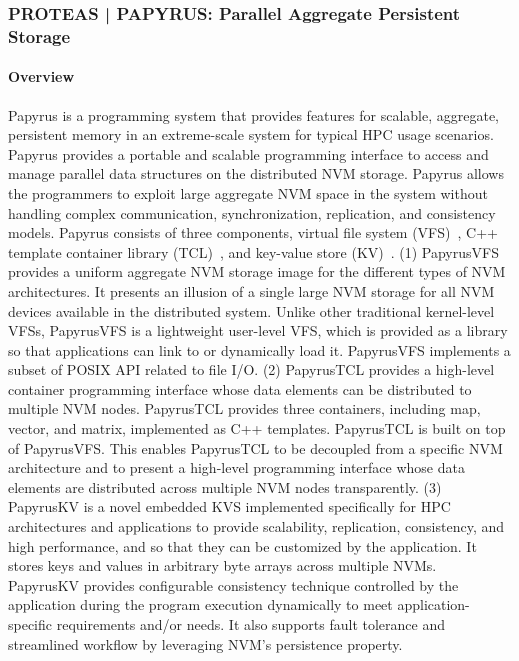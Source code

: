 \subsubsection{PROTEAS | PAPYRUS: Parallel Aggregate Persistent Storage}\label{s:papyrus}

\paragraph{Overview} 
Papyrus is a programming system that provides features for scalable, aggregate, persistent memory in an extreme-scale system for typical HPC usage scenarios. Papyrus provides a portable and scalable programming interface to access and manage parallel data structures on the distributed NVM storage. Papyrus allows the programmers to exploit large aggregate NVM space in the system without handling complex communication, synchronization, replication, and consistency models. Papyrus consists of three components, virtual file system (VFS)~\cite{Kim:2017:DIP}, C++ template container library (TCL)~\cite{Kim:2017:DIP}, and key-value store (KV)~\cite{Kim:2017:PHP}.
(1) PapyrusVFS provides a uniform aggregate NVM storage image for the different types of NVM architectures. It presents an illusion of a single large NVM storage for all NVM devices available in the distributed system. Unlike other traditional kernel-level VFSs, PapyrusVFS is a lightweight user-level VFS, which is provided as a library so that applications can link to or dynamically load it. PapyrusVFS implements a subset of POSIX API related to file I/O. (2) PapyrusTCL provides a high-level container programming interface whose data elements can be distributed to multiple NVM nodes. PapyrusTCL provides three containers, including map, vector, and matrix, implemented as C++ templates. PapyrusTCL is built on top of PapyrusVFS. This enables PapyrusTCL to be decoupled from a specific NVM architecture and to present a high-level programming interface whose data elements are distributed across multiple NVM nodes transparently. (3) PapyrusKV is a novel embedded KVS implemented specifically for HPC architectures and applications to provide scalability, replication, consistency, and high performance, and so that they can be customized by the application. It stores keys and values in arbitrary byte arrays across multiple NVMs. PapyrusKV provides configurable consistency technique controlled by the application during the program execution dynamically to meet application-specific requirements and/or needs. It also supports fault tolerance and streamlined workflow by leveraging NVM's persistence property.

